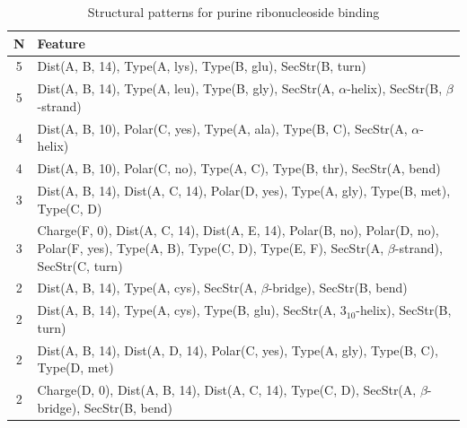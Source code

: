 \documentclass[11pt,twoside,a4paper]{book}
\begin{document}
\begin{table}\begin{tabularx}{\textwidth}{cX}\textbf{N} & \textbf{Feature} \\ \hline  
5 & Dist(A, B, 14),  Type(A, lys), Type(B, glu), SecStr(B, turn)\\ \hline 
5 & Dist(A, B, 14),  Type(A, leu), Type(B, gly), SecStr(A, $\alpha$-helix), SecStr(B, $\beta$-strand)\\ \hline 
4 & Dist(A, B, 10), Polar(C, yes),  Type(A, ala), Type(B, C), SecStr(A, $\alpha$-helix)\\ \hline 
4 & Dist(A, B, 10), Polar(C, no),  Type(A, C), Type(B, thr), SecStr(A, bend)\\ \hline 
3 & Dist(A, B, 14), Dist(A, C, 14), Polar(D, yes),  Type(A, gly), Type(B, met), \newline Type(C, D)\\ \hline 
3 & Charge(F, 0), Dist(A, C, 14), Dist(A, E, 14), Polar(B, no), Polar(D, no), \newline Polar(F, yes),  Type(A, B), Type(C, D), Type(E, F), SecStr(A, $\beta$-strand), \newline SecStr(C, turn)\\ \hline 
2 & Dist(A, B, 14),  Type(A, cys), SecStr(A, $\beta$-bridge), SecStr(B, bend)\\ \hline 
2 & Dist(A, B, 14),  Type(A, cys), Type(B, glu), SecStr(A, $3_{10}$-helix), SecStr(B, turn)\\ \hline 
2 & Dist(A, B, 14), Dist(A, D, 14), Polar(C, yes),  Type(A, gly), Type(B, C), \newline Type(D, met)\\ \hline 
2 & Charge(D, 0), Dist(A, B, 14), Dist(A, C, 14),  Type(C, D), SecStr(A, $\beta$-bridge), \newline SecStr(B, bend)\\ \hline 
 \end{tabularx}\caption{Structural patterns for purine ribonucleoside binding}\label{tab:purine_ribonucleoside_binding}\end{table}
\end{document}
